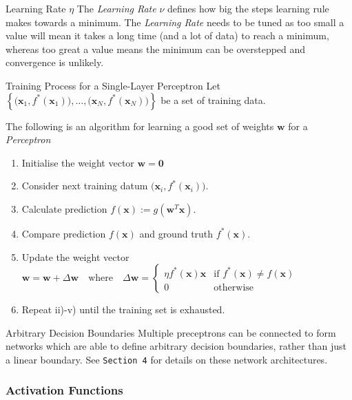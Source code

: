 \documentclass[11pt,a4paper]{article}
\begin{document}
  \begin{remark}{Learning Rate $\eta$}
    The \textit{Learning Rate} $\nu$ defines how big the steps learning rule makes towards a minimum. The \textit{Learning Rate} needs to be tuned as too small a value will mean it takes a long time (and a lot of data) to reach a minimum, whereas too great a value means the minimum can be overstepped and convergence is unlikely.
  \end{remark}

  \begin{proposition}{Training Process for a Single-Layer Perceptron}
    Let $\left\{\big(\pmb{x}_1,f^*(\pmb{x}_1)\big),\dots,\big(\pmb{x}_N,f^*(\pmb{x}_N)\big)\right\}$ be a set of training data.
    \par The following is an algorithm for learning a good set of weights $\pmb{w}$ for a \textit{Perceptron}
    \begin{enumerate}
      \item Initialise the weight vector $\pmb{w}=\pmb0$
      \item Consider next training datum $\big(\pmb{x}_i,f^*(\pmb{x}_i)\big)$.
      \item Calculate prediction $f(\pmb{x}):=g(\mathbf{w}^T\mathbf{x})$.
      \item Compare prediction $f(\pmb{x})$ and ground truth $f^*(\pmb{x})$.
      \item Update the weight vector $\pmb{w}=\pmb{w}+\Delta\pmb{w}\quad\text{where}\quad\Delta\pmb{w}=\begin{cases}\eta f^*(\pmb{x})\pmb{x}&\text{if }f^*(\pmb{x})\neq f(\pmb{x})\\0&\text{otherwise}\end{cases}$
      \item Repeat ii)-v) until the training set is exhausted.
    \end{enumerate}
  \end{proposition}

  \begin{remark}{Arbitrary Decision Boundaries}
    Multiple preceptrons can be connected to form networks which are able to define arbitrary decision boundaries, rather than just a linear boundary. See \texttt{Section 4} for details on these network architectures.
  \end{remark}

\subsubsection{Activation Functions} \label{sec_ActivationFunctions}
\end{document}
